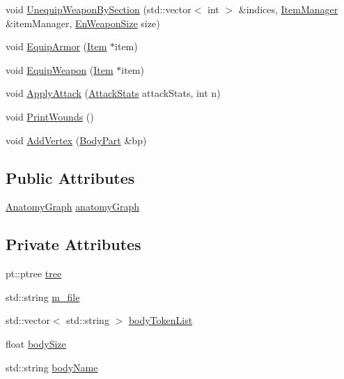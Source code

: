 \begin{DoxyCompactItemize}
\item 
void \mbox{\hyperlink{class_creature_body_a4cd14d7e1ed54d8beeb853a99ff0516c}{Unequip\+Weapon\+By\+Section}} (std\+::vector$<$ int $>$ \&indices, \mbox{\hyperlink{class_item_manager}{Item\+Manager}} \&item\+Manager, \mbox{\hyperlink{_weapon_8hpp_a160076f6c574c69cd1ce2b3f42cf3755}{En\+Weapon\+Size}} size)
\item 
void \mbox{\hyperlink{class_creature_body_a5a14d8decef3d1051ac7e9d79a1a4b72}{Equip\+Armor}} (\mbox{\hyperlink{class_item}{Item}} $\ast$item)
\item 
void \mbox{\hyperlink{class_creature_body_af329b825db569100370683f7a9b0263c}{Equip\+Weapon}} (\mbox{\hyperlink{class_item}{Item}} $\ast$item)
\item 
void \mbox{\hyperlink{class_creature_body_aa6525bf32e8f99cc5bd1bda76044964d}{Apply\+Attack}} (\mbox{\hyperlink{struct_attack_stats}{Attack\+Stats}} attack\+Stats, int n)
\item 
void \mbox{\hyperlink{class_creature_body_a82e519351551538b1138fea170776f3f}{Print\+Wounds}} ()
\item 
void \mbox{\hyperlink{class_creature_body_ad41423874acaacde458a04b99c468c91}{Add\+Vertex}} (\mbox{\hyperlink{class_body_part}{Body\+Part}} \&bp)
\end{DoxyCompactItemize}
\subsection*{Public Attributes}
\begin{DoxyCompactItemize}
\item 
\mbox{\hyperlink{_body_graph_8hpp_ab01b157c2e143191570b012d275fbf0d}{Anatomy\+Graph}} \mbox{\hyperlink{class_creature_body_aa0fc6dc283a463e31f34c0ce9c2f1182}{anatomy\+Graph}}
\end{DoxyCompactItemize}
\subsection*{Private Attributes}
\begin{DoxyCompactItemize}
\item 
pt\+::ptree \mbox{\hyperlink{class_creature_body_aa7e0155e84f81f2fb5fda0696d17ab27}{tree}}
\item 
std\+::string \mbox{\hyperlink{class_creature_body_a7bb511e3d385b86c65613a627f33bd20}{m\+\_\+file}}
\item 
std\+::vector$<$ std\+::string $>$ \mbox{\hyperlink{class_creature_body_ad882f21d3166e49c5b8def87121bb9c0}{body\+Token\+List}}
\item 
float \mbox{\hyperlink{class_creature_body_ae91bf63d2607dc4ee6e56fb1b7558fa4}{body\+Size}}
\item 
std\+::string \mbox{\hyperlink{class_creature_body_a9d0be8de94783d95307a80fe0acf7aa9}{body\+Name}}
\end{DoxyCompactItemize}


